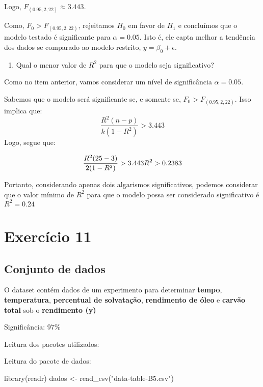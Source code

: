 \documentclass[
]{article}
\newenvironment{Shaded}{\begin{snugshade}}{\end{snugshade}}
\newcommand{\FunctionTok}[1]{\textcolor[rgb]{0.00,0.00,0.00}{#1}}
\newcommand{\NormalTok}[1]{#1}
\newcommand{\OtherTok}[1]{\textcolor[rgb]{0.56,0.35,0.01}{#1}}
\newcommand{\StringTok}[1]{\textcolor[rgb]{0.31,0.60,0.02}{#1}}
\providecommand{\tightlist}{%
  \setlength{\itemsep}{0pt}\setlength{\parskip}{0pt}}
\begin{document}
Logo, \(F_{(0.95,2,22)} \approx 3.443\).

Como, \(F_0 > F_{(0.95,2,22)}\), rejeitamos \(H_0\) em favor de \(H_1\)
e concluímos que o modelo testado é significante para \(\alpha = 0.05\).
Isto é, ele capta melhor a tendência dos dados se comparado ao modelo
restrito, \(y = \beta_0 + \epsilon\).

\begin{enumerate}
\def\labelenumi{\alph{enumi})}
\setcounter{enumi}{1}
\tightlist
\item
  Qual o menor valor de \(R^2\) para que o modelo seja significativo?
\end{enumerate}

Como no item anterior, vamos considerar um nível de significância
\(\alpha = 0.05\).

Sabemos que o modelo será significante se, e somente se,
\(F_0 > F_{(0.95,2,22)}\). Isso implica que:
\[\frac{R^2(n-p)}{k (1- R^2)} > 3.443\] Logo, segue que:

\[\frac{R^2(25-3)}{2 (1- R^2)} > 3.443 \\
R^2>0.2383\]

Portanto, considerando apenas dois algarismos significativos, podemos
considerar que o valor mínimo de \(R^2\) para que o modelo possa ser
considerado significativo é \(R^2 = 0.24\)

\hypertarget{exercuxedcio-11}{%
\section{Exercício 11}\label{exercuxedcio-11}}

\hypertarget{conjunto-de-dados}{%
\subsection{Conjunto de dados}\label{conjunto-de-dados}}

O dataset contém dados de um experimento para determinar \textbf{tempo},
\textbf{temperatura}, \textbf{percentual de solvatação},
\textbf{rendimento de óleo} e \textbf{carvão total} sob o
\textbf{rendimento (y)}

Significância: 97\%

Leitura dos pacotes utilizados:

Leitura do pacote de dados:

\begin{Shaded}
\begin{Highlighting}[]
\FunctionTok{library}\NormalTok{(readr)}
\NormalTok{dados }\OtherTok{\textless{}{-}} \FunctionTok{read\_csv}\NormalTok{(}\StringTok{"data{-}table{-}B5.csv"}\NormalTok{)}
\end{Highlighting}
\end{Shaded}
\end{document}
